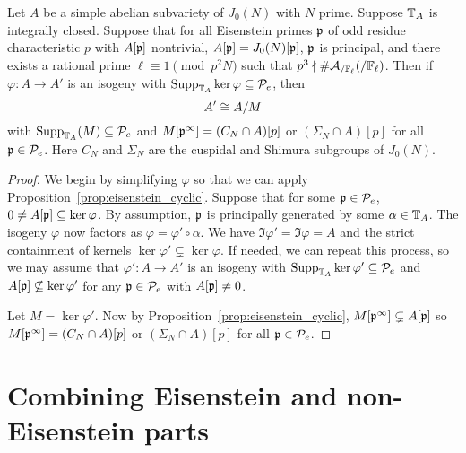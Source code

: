 \documentclass[thesis.tex]{subfiles}
\begin{document}
\begin{corollary}
    \label{cor:eisenstein}
    Let $A$ be a simple abelian subvariety of $J_0(N)$ with $N$ prime. Suppose
    $\mathbb{T}_A$ is integrally closed. Suppose that for all Eisenstein primes $\mathfrak{p}$
    of odd residue characteristic $p$ with $A[\mathfrak{p}]$ nontrivial,
    $A[\mathfrak{p}]=J_0(N)[\mathfrak{p}]$, $\mathfrak{p}$ is principal, and there exists a rational prime
    $\ell\equiv 1\pmod{p^2N}$ such that $p^3\nmid
    \#\mathcal{A}_{/\mathbb{F}_\ell}(/\mathbb{F}_\ell)$. Then if $\varphi:A\to A'$ is an
    isogeny with $\operatorname{Supp}_{\mathbb{T}_A} \ker\varphi\subseteq \mathcal{P}_e$, then
    \[
        A'\cong A/M
    \]
    with $\operatorname{Supp}_{\mathbb{T}_A}(M)\subseteq \mathcal{P}_e$ and $M[\mathfrak{p}^\infty]=(C_N\cap A)[p]$ or
    $(\Sigma_N\cap A)[p]$ for all $\mathfrak{p}\in \mathcal{P}_e$. Here $C_N$ and $\Sigma_N$ are
    the cuspidal and Shimura subgroups of $J_0(N)$.
\end{corollary}
\begin{proof}
    We begin by simplifying $\varphi$ so that we can apply
    Proposition~\ref{prop:eisenstein_cyclic}. Suppose that for some $\mathfrak{p}\in
    \mathcal{P}_e$, $0\neq A[\mathfrak{p}]\subseteq \ker\varphi$. By assumption, $\mathfrak{p}$ is
    principally generated by some $\alpha\in \mathbb{T}_A$. The isogeny $\varphi$ now
    factors as $\varphi=\varphi'\circ \alpha$. We have
    $\Im\varphi'=\Im\varphi=A$ and the strict containment of kernels
    $\ker\varphi'\subsetneq \ker\varphi$. If needed, we can repeat this
    process, so we may assume that $\varphi':A\to A'$ is an isogeny with
    $\operatorname{Supp}_{\mathbb{T}_A}\ker\varphi'\subseteq \mathcal{P}_e$ and $A[\mathfrak{p}]\not\subseteq
    \ker\varphi'$ for any $\mathfrak{p}\in \mathcal{P}_e$ with $A[\mathfrak{p}]\neq 0$.

    Let $M=\ker\varphi'$. Now by Proposition~\ref{prop:eisenstein_cyclic},
    $M[\mathfrak{p}^\infty]\subsetneq A[\mathfrak{p}]$ so $M[\mathfrak{p}^\infty]=(C_N\cap A)[p]$ or
    $(\Sigma_N\cap A)[p]$ for all $\mathfrak{p}\in \mathcal{P}_e$.
\end{proof}


\section{Combining Eisenstein and non-Eisenstein parts}%
\label{sec:combining_eisenstein_and_non_eisenstein_parts}
\end{document}

